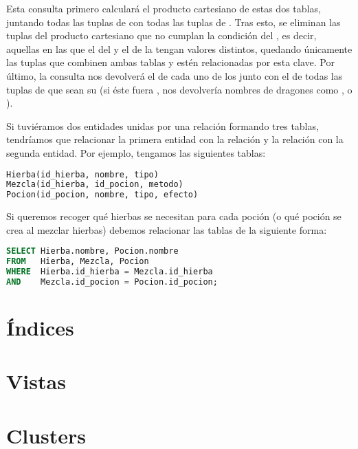 Esta consulta primero calculará el producto cartesiano de estas dos tablas, juntando todas las tuplas de  con todas las tuplas de .
Tras esto, se eliminan las tuplas del producto cartesiano que no cumplan la condición del , es decir, aquellas en las que el  del  y el  de la  tengan valores distintos, quedando únicamente las tuplas que combinen ambas tablas y estén relacionadas por esta clave.
Por último, la consulta nos devolverá el  de cada uno de los  junto con el  de todas las tuplas de  que sean su  (si éste fuera , nos devolvería nombres de dragones como ,  o ).

Si tuviéramos dos entidades unidas por una relación formando tres tablas, tendríamos que relacionar la primera entidad con la relación y la relación con la segunda entidad.
Por ejemplo, tengamos las siguientes tablas:

\begin{lstlisting}[language=SQL]
Hierba(id_hierba, nombre, tipo)
Mezcla(id_hierba, id_pocion, metodo)
Pocion(id_pocion, nombre, tipo, efecto)
\end{lstlisting}

Si queremos recoger qué hierbas se necesitan para cada poción (o qué poción se crea al mezclar hierbas) debemos relacionar las tablas de la siguiente forma:

\begin{lstlisting}[language=SQL]
SELECT Hierba.nombre, Pocion.nombre
FROM   Hierba, Mezcla, Pocion
WHERE  Hierba.id_hierba = Mezcla.id_hierba
AND    Mezcla.id_pocion = Pocion.id_pocion;
\end{lstlisting}

\section{Índices}\label{indices}

\section{Vistas}\label{visitas}

\section{Clusters}\label{clusters}
